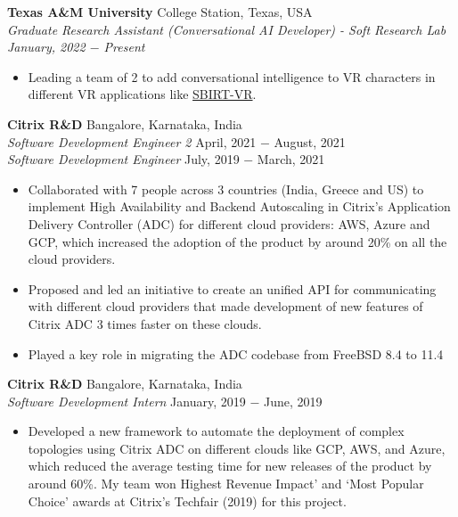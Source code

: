 \documentclass{article}
\begin{document}
\noindent \textbf{Texas A\&M University} \hfill College Station, Texas, USA\\
\textit{Graduate Research Assistant (Conversational AI Developer) - Soft Research Lab \hfill January, 2022 $-$ Present}
\begin{itemize}[noitemsep,nolistsep,leftmargin=*]
\item {Leading a team of 2 to add conversational intelligence to VR characters in different VR applications like \href{https://softinteraction.com/portfolio/sbirt-vr}{SBIRT-VR}}.\\
\end{itemize}
\noindent \textbf{Citrix R\&D} \hfill Bangalore, Karnataka, India \\
\textit{Software Development Engineer 2} \hfill April, 2021 $-$ August, 2021 \\
\textit{Software Development Engineer} \hfill July, 2019 $-$ March, 2021 
\begin{itemize}[noitemsep,nolistsep,leftmargin=*]
\item {Collaborated with 7 people across 3 countries (India, Greece and US) to implement High Availability and Backend Autoscaling in Citrix's Application Delivery Controller (ADC) for different cloud providers: AWS, Azure and GCP, which increased the adoption of the product by around 20\% on all the cloud providers.}
\item {Proposed and led an initiative to create an unified API for communicating with different cloud providers that made development of new features of Citrix ADC 3 times faster on these clouds. }
\item {Played a key role in migrating the ADC codebase from FreeBSD 8.4 to 11.4\\}
\end{itemize}

\noindent \textbf{Citrix R\&D} \hfill Bangalore, Karnataka, India \\
\textit{Software Development Intern} \hfill January, 2019 $-$ June, 2019
\begin{itemize}[noitemsep,nolistsep,leftmargin=*]
\item {Developed a new framework to automate the deployment of complex topologies using Citrix ADC on different clouds like GCP, AWS, and Azure, which reduced the average testing time for new releases of the product by around 60\%. My team won Highest Revenue Impact’ and ‘Most Popular Choice’ awards at Citrix's Techfair (2019) for this project.\\}
\end{itemize}
\end{document}
